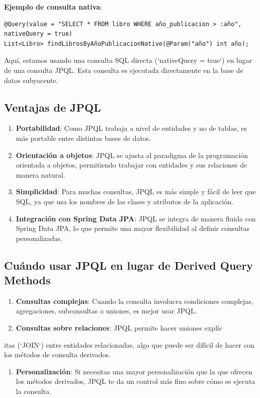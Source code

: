 \documentclass[11pt]{article}
\begin{document}
\textbf{\textbf{Ejemplo de consulta nativa}}:

\begin{verbatim}
@Query(value = "SELECT * FROM libro WHERE año_publicacion > :año", nativeQuery = true)
List<Libro> findLibrosByAñoPublicacionNative(@Param("año") int año);
\end{verbatim}

Aquí, estamos usando una consulta SQL directa (`nativeQuery = true`) en lugar de una consulta JPQL. Esta consulta es ejecutada directamente en la base de datos subyacente.

\subsection{Ventajas de JPQL}
\label{sec:orga11f69d}
\begin{enumerate}
\item \textbf{\textbf{Portabilidad}}: Como JPQL trabaja a nivel de entidades y no de tablas, es más portable entre distintas bases de datos.
\item \textbf{\textbf{Orientación a objetos}}: JPQL se ajusta al paradigma de la programación orientada a objetos, permitiendo trabajar con entidades y sus relaciones de manera natural.
\item \textbf{\textbf{Simplicidad}}: Para muchas consultas, JPQL es más simple y fácil de leer que SQL, ya que usa los nombres de las clases y atributos de la aplicación.
\item \textbf{\textbf{Integración con Spring Data JPA}}: JPQL se integra de manera fluida con Spring Data JPA, lo que permite una mayor flexibilidad al definir consultas personalizadas.
\end{enumerate}

\subsection{Cuándo usar JPQL en lugar de Derived Query Methods}
\label{sec:org248729b}
\begin{enumerate}
\item \textbf{\textbf{Consultas complejas}}: Cuando la consulta involucra condiciones complejas, agregaciones, subconsultas o uniones, es mejor usar JPQL.
\item \textbf{\textbf{Consultas sobre relaciones}}: JPQL permite hacer uniones explíc
\end{enumerate}

itas (`JOIN`) entre entidades relacionadas, algo que puede ser difícil de hacer con los métodos de consulta derivados.
\begin{enumerate}
\item \textbf{\textbf{Personalización}}: Si necesitas una mayor personalización que la que ofrecen los métodos derivados, JPQL te da un control más fino sobre cómo se ejecuta la consulta.
\end{enumerate}
\end{document}
